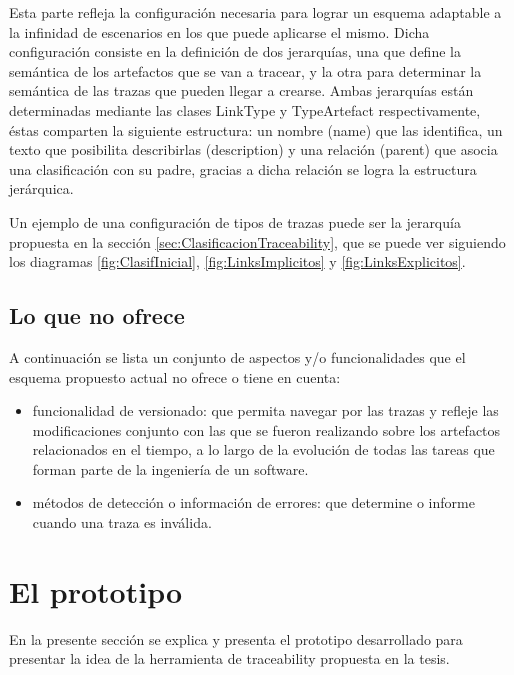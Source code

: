 \documentclass[a4paper,12pt,oneside,spanish]{book}
\begin{document}
Esta parte refleja la configuración necesaria para lograr un esquema adaptable a la infinidad de escenarios en los que puede aplicarse el mismo. Dicha configuración consiste en la definición de dos jerarquías, una que define la semántica de los artefactos que se van a tracear, y la otra para determinar la semántica de las trazas que pueden llegar a crearse. Ambas jerarquías están determinadas mediante las clases LinkType y TypeArtefact respectivamente, éstas comparten la siguiente estructura: un nombre (name) que las identifica, un texto que posibilita describirlas (description) y una relación (parent) que asocia una clasificación con su padre, gracias a dicha relación se logra la estructura jerárquica.

Un ejemplo de una configuración de tipos de trazas puede ser la jerarquía propuesta en la sección \ref{sec:ClasificacionTraceability}, que se puede ver siguiendo los diagramas \ref{fig:ClasifInicial}, \ref{fig:LinksImplicitos} y \ref{fig:LinksExplicitos}.


\subsection{Lo que no ofrece}

A continuación se lista un conjunto de aspectos y/o funcionalidades que el esquema propuesto actual no ofrece o tiene en cuenta:

\begin{itemize}

\item funcionalidad de versionado: que permita navegar por las trazas y refleje las modificaciones conjunto con las que se fueron realizando sobre los artefactos relacionados en el tiempo, a lo largo de la evolución de todas las tareas que forman parte de la ingeniería de un software.

\item métodos de detección o información de errores: que determine o informe cuando una traza es inválida.

\end{itemize}


\section{El prototipo}

En la presente sección se explica y presenta el prototipo desarrollado  para presentar la idea de la herramienta de traceability propuesta en la tesis.
\end{document}
